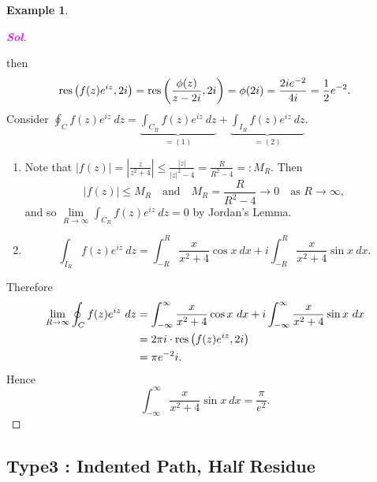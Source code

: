 \documentclass[12pt,openany]{book}
\theoremstyle{definition}
\newtheorem{example}{Example}[section]
\newcommand{\of}[1]{\left( #1 \right)}
\newcommand{\abs}[1]{\left\lvert #1 \right\rvert}
\newcommand{\sol}{\textcolor{magenta}{\bf Sol}}
\newcommand{\res}{\textnormal{res}}
\begin{document}
\begin{example}
\begin{proof}[\sol]
\begin{center}
			\end{center} then \[
			\res\of{f(z)e^{iz},2i}=\res\of{\frac{\phi(z)}{z-2i},2i}=\phi(2i)=\frac{2ie^{-2}}{4i}=\frac{1}{2}e^{-2}.
			\] Consider $
			\displaystyle\oint_C f(z)e^{iz}\ dz=\underbrace{\int_{C_R}f(z)e^{iz}\ dz}_{=(1)}+\underbrace{\int_{I_R}f(z)e^{iz}\ dz}_{=(2)}.
			$ \begin{enumerate}[(1)]
				\item Note that $\abs{f(z)}=\abs{\frac{z}{z^2+4}}\leq\frac{\abs{z}}{\abs{z}^2-4}=\frac{R}{R^2-4}=:M_R$. Then \[
				\abs{f(z)}\leq M_R\quad\text{and}\quad M_R=\frac{R}{R^2-4}\to 0\quad\text{as $R\to\infty$},
				\] and so $\lim\limits_{R\to\infty}\int_{C_R}f(z)e^{iz}\ dz=0$ by Jordan's Lemma.
				\item \[
				\int_{I_R}f(z)e^{iz}\ dz=\int_{-R}^R\frac{x}{x^2+4}\cos x\ dx+i\int_{-R}^R\frac{x}{x^2+4}\sin x\ dx.
				\]
			\end{enumerate}
			Therefore \begin{align*}
			\lim\limits_{R\to\infty}\oint_C f(z)e^{iz}\ dz&=\int_{-\infty}^{\infty}\frac{x}{x^2+4}\cos x\ dx+i\int_{-\infty}^{\infty}\frac{x}{x^2+4}\sin x\ dx\\
			&=2\pi i\cdot\res\of{f(z)e^{iz}, 2i}\\
			&=\pi e^{-2}i.
		\end{align*} Hence \[
		\int_{-\infty}^{\infty}\frac{x}{x^2+4}\sin x\ dx=\frac{\pi}{e^2}.
		\]
		\end{proof}
	\end{example}
	
	\newpage
	\subsection{Type3 : Indented Path, Half Residue}
	
\end{document}
